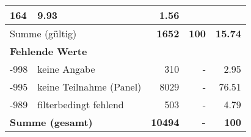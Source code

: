 \begin{longtable}{lXrrr}
       \num{164} &
       \num[round-mode=places,round-precision=2]{9,93} &
         \num[round-mode=places,round-precision=2]{1,56} \\
     \midrule
     \multicolumn{2}{l}{Summe (gültig)} &
       \textbf{\num{1652}} &
     \textbf{100} &
       \textbf{\num[round-mode=places,round-precision=2]{15,74}} \\
     \multicolumn{5}{l}{\textbf{Fehlende Werte}}\\
       -998 &
       keine Angabe &
         \num{310} &
        - &
         \num[round-mode=places,round-precision=2]{2,95} \\
       -995 &
       keine Teilnahme (Panel) &
         \num{8029} &
        - &
         \num[round-mode=places,round-precision=2]{76,51} \\
       -989 &
       filterbedingt fehlend &
         \num{503} &
        - &
         \num[round-mode=places,round-precision=2]{4,79} \\
     \midrule
     \multicolumn{2}{l}{\textbf{Summe (gesamt)}} &
          \textbf{\num{10494}} &
        \textbf{-} &
        \textbf{100} \\
     \bottomrule
     \end{longtable}
     
